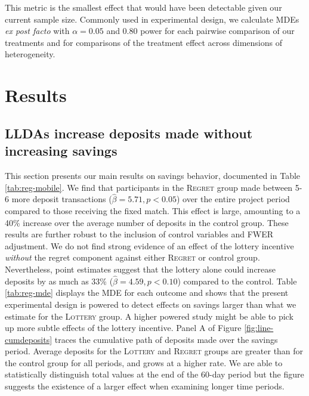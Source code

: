 \documentclass[12pt]{article}
\begin{document}
		This metric is the smallest effect that would have been detectable given our current sample size. Commonly used in experimental design, we calculate MDEs \textit{ex post facto} with $\alpha = 0.05$ and 0.80 power for each pairwise comparison of our treatments and for comparisons of the treatment effect across dimensions of heterogeneity.

\section{Results} \label{sec:results}

	\subsection{LLDAs increase deposits made without increasing savings}

		This section presents our main results on savings behavior, documented in Table \ref{tab:reg-mobile}. We find that participants in the \textsc{Regret} group made between 5-6 more deposit transactions ($\hat \beta = 5.71, p < 0.05$) over the entire project period compared to those receiving the fixed match. This effect is large, amounting to a 40\% increase over the average number of deposits in the control group. These results are further robust to the inclusion of control variables and FWER adjustment. We do not find strong evidence of an effect of the lottery incentive \textit{without} the regret component against either \textsc{Regret} or control group. Nevertheless, point estimates suggest that the lottery alone could increase deposits by as much as 33\% ($\hat \beta = 4.59, p < 0.10$) compared to the control. Table \ref{tab:reg-mde} displays the MDE for each outcome and shows that the present experimental design is powered to detect effects on savings larger than what we estimate for the \textsc{Lottery} group. A higher powered study might be able to pick up more subtle effects of the lottery incentive. Panel A of Figure \ref{fig:line-cumdeposits} traces the cumulative path of deposits made over the savings period. Average deposits for the \textsc{Lottery} and \textsc{Regret} groups are greater than for the control group for all periods, and grows at a higher rate. We are able to statistically distinguish total values at the end of the 60-day period but the figure suggests the existence of a larger effect when examining longer time periods.

\end{document}
